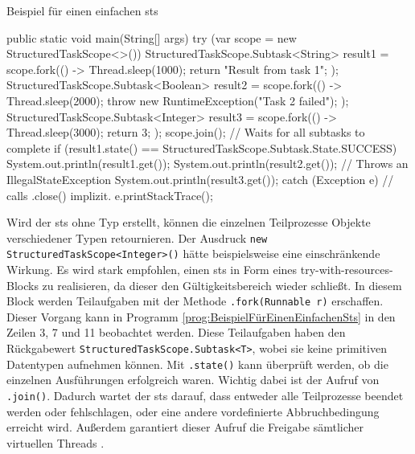     \begin{program} [H]
        \caption{Beispiel für einen einfachen \gls{sts}}
        \label{prog:BeispielFürEinenEinfachenSts}
    \begin{JavaCode}[language=Java, numbers=left]
public static void main(String[] args) {
    try (var scope = new StructuredTaskScope<>()) {
        StructuredTaskScope.Subtask<String> result1 = scope.fork(() -> {
            Thread.sleep(1000);
            return "Result from task 1";
        });
        StructuredTaskScope.Subtask<Boolean> result2 = scope.fork(() -> {
            Thread.sleep(2000);
            throw new RuntimeException("Task 2 failed");
        });
        StructuredTaskScope.Subtask<Integer> result3 = scope.fork(() -> {
            Thread.sleep(3000);
            return 3;
        });
        scope.join();                        // Waits for all subtasks to complete
        if (result1.state() == StructuredTaskScope.Subtask.State.SUCCESS){
            System.out.println(result1.get());  
        } 
        System.out.println(result2.get());   // Throws an IllegalStateException
        System.out.println(result3.get());
    } catch (Exception e) {                  // calls .close() implizit.
        e.printStackTrace();
    }
}\end{JavaCode}
    \end{program}
    Wird der \gls{sts} ohne Typ erstellt, können die einzelnen Teilprozesse Objekte verschiedener Typen retournieren. Der Ausdruck \texttt{new StructuredTaskScope<Integer>()}
    hätte beispielsweise eine einschränkende Wirkung.
    Es wird stark empfohlen, einen \gls{sts} in Form eines try-with-resources-Blocks zu realisieren, da dieser den Gültigkeitsbereich wieder schließt. In diesem Block
    werden Teilaufgaben mit der Methode \texttt{.fork(Runnable r)} erschaffen. Dieser Vorgang kann in Programm \ref{prog:BeispielFürEinenEinfachenSts} in den Zeilen 3, 7 und 11 beobachtet werden.
    Diese Teilaufgaben haben den Rückgabewert \texttt{StructuredTaskScope.Subtask<T>}, wobei sie keine
    primitiven Datentypen aufnehmen können. Mit \texttt{.state()} kann überprüft werden, ob die einzelnen Ausführungen erfolgreich waren.
    Wichtig dabei ist der Aufruf von \texttt{.join()}. Dadurch wartet der \gls{sts} darauf, dass entweder alle Teilprozesse beendet werden oder
    fehlschlagen, oder
    eine andere vordefinierte Abbruchbedingung erreicht wird. Außerdem garantiert dieser Aufruf die Freigabe sämtlicher virtuellen Threads \cite{oracle21STS}.
    

